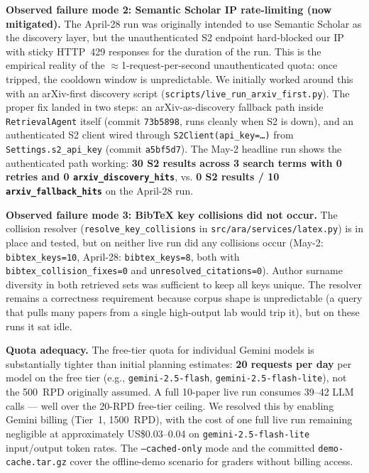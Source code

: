 \documentclass[12pt,a4paper]{article}
\begin{document}
\textbf{Observed failure mode 2: Semantic Scholar IP rate-limiting (now
mitigated).} The April-28 run was originally intended to use Semantic Scholar
as the discovery layer, but the unauthenticated S2 endpoint hard-blocked our
IP with sticky HTTP~429 responses for the duration of the run. This is the
empirical reality of the $\approx$1-request-per-second unauthenticated quota:
once tripped, the cooldown window is unpredictable. We initially worked
around this with an arXiv-first discovery script
(\texttt{scripts/live\_run\_arxiv\_first.py}). The proper fix landed in two
steps: an arXiv-as-discovery fallback path inside \texttt{RetrievalAgent}
itself (commit \texttt{73b5898}, runs cleanly when S2 is down), and an
authenticated S2 client wired through \texttt{S2Client(api\_key=\dots)} from
\texttt{Settings.s2\_api\_key} (commit \texttt{a5bf5d7}). The May-2 headline
run shows the authenticated path working: \textbf{30 S2 results across 3
search terms with 0 retries and 0 \texttt{arxiv\_discovery\_hits}}, vs.
\textbf{0 S2 results / 10 \texttt{arxiv\_fallback\_hits}} on the April-28 run.

\textbf{Observed failure mode 3: BibTeX key collisions did not occur.} The
collision resolver (\texttt{resolve\_key\_collisions} in
\texttt{src/ara/services/latex.py}) is in place and tested, but on neither
live run did any collisions occur (May-2: \texttt{bibtex\_keys=10}, April-28:
\texttt{bibtex\_keys=8}, both with \texttt{bibtex\_collision\_fixes=0} and
\texttt{unresolved\_citations=0}). Author surname diversity in both
retrieved sets was sufficient to keep all keys unique. The resolver remains a
correctness requirement because corpus shape is unpredictable (a query that
pulls many papers from a single high-output lab would trip it), but on these
runs it sat idle.

\textbf{Quota adequacy.} The free-tier quota for individual Gemini models is
substantially tighter than initial planning estimates: \textbf{20 requests per
day} per model on the free tier (e.g., \texttt{gemini-2.5-flash},
\texttt{gemini-2.5-flash-lite}), not the 500~RPD originally assumed. A full
10-paper live run consumes 39--42 LLM calls --- well over the 20-RPD
free-tier ceiling. We resolved this by enabling Gemini billing (Tier~1,
1500~RPD), with the cost of one full live run remaining negligible at
approximately US\$0.03--0.04 on \texttt{gemini-2.5-flash-lite} input/output
token rates. The \texttt{--cached-only} mode and the committed
\texttt{demo-cache.tar.gz} cover the offline-demo scenario for graders without
billing access.
\end{document}
